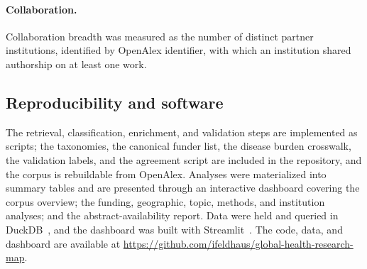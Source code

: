 \paragraph{Collaboration.}
Collaboration breadth was measured as the number of distinct partner
institutions, identified by OpenAlex identifier, with which an institution
shared authorship on at least one work.

\subsection{Reproducibility and software}

The retrieval, classification, enrichment, and validation steps are implemented
as scripts; the taxonomies, the canonical funder list, the disease burden
crosswalk, the validation labels, and the agreement script are included in the
repository, and the corpus is rebuildable from OpenAlex. Analyses were
materialized into summary tables and are presented through an interactive
dashboard covering the corpus overview; the funding, geographic, topic,
methods, and institution analyses; and the abstract-availability report. Data
were held and queried in DuckDB~\cite{duckdb}, and the dashboard was built with
Streamlit~\cite{streamlit}. The code, data, and dashboard are available at
\url{https://github.com/ifeldhaus/global-health-research-map}.
